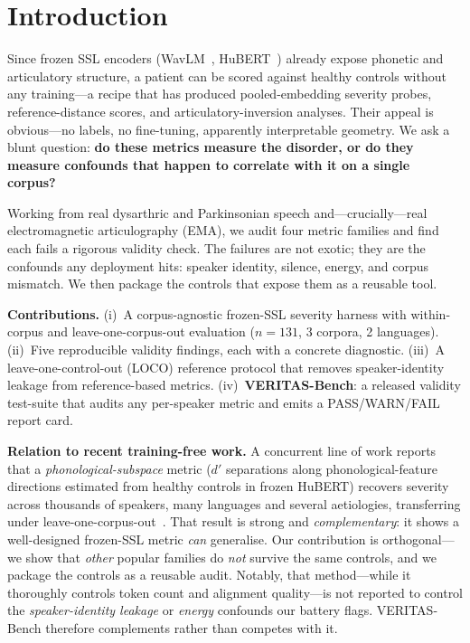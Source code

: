 \documentclass[conference]{IEEEtran}
\begin{document}
\section{Introduction}
Since frozen SSL encoders (WavLM~\cite{chen2022wavlm}, HuBERT~\cite{hsu2021hubert})
already expose phonetic and articulatory structure, a patient can be scored against
healthy controls without any training---a recipe that has produced pooled-embedding
severity probes, reference-distance scores, and articulatory-inversion analyses. Their appeal is
obvious---no labels, no fine-tuning, apparently interpretable geometry. We ask a
blunt question: \textbf{do these metrics measure the disorder, or do they measure
confounds that happen to correlate with it on a single corpus?}

Working from real dysarthric and Parkinsonian speech and---crucially---real
electromagnetic articulography (EMA), we audit four metric families and find each
fails a rigorous validity check. The failures are not exotic; they are the
confounds any deployment hits: speaker identity, silence, energy, and corpus
mismatch. We then package the controls that expose them as a reusable tool.

\noindent\textbf{Contributions.}
(i)~A corpus-agnostic frozen-SSL severity harness with within-corpus and
leave-one-corpus-out evaluation ($n{=}131$, 3 corpora, 2 languages).
(ii)~Five reproducible validity findings, each with a concrete diagnostic.
(iii)~A leave-one-control-out (LOCO) reference protocol that removes
speaker-identity leakage from reference-based metrics.
(iv)~\textbf{VERITAS-Bench}: a released validity test-suite that audits any
per-speaker metric and emits a PASS/WARN/FAIL report card.

\noindent\textbf{Relation to recent training-free work.}
A concurrent line of work reports that a \emph{phonological-subspace} metric
($d'$ separations along phonological-feature directions estimated from healthy
controls in frozen HuBERT) recovers severity across thousands of speakers, many
languages and several aetiologies, transferring under
leave-one-corpus-out~\cite{frozenssl2026a,frozenssl2026b}. That result is strong
and \emph{complementary}: it shows a well-designed frozen-SSL metric \emph{can}
generalise. Our contribution is orthogonal---we show that \emph{other} popular
families do \emph{not} survive the same controls, and we package the controls as
a reusable audit. Notably, that method---while it thoroughly controls token count
and alignment quality---is not reported to control the \emph{speaker-identity
leakage} or \emph{energy} confounds our battery flags. VERITAS-Bench therefore
complements rather than competes with it.
\end{document}
